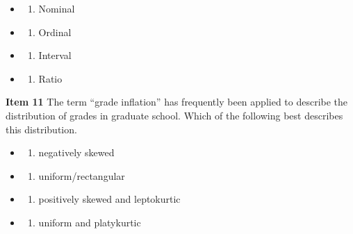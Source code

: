 \documentclass[
  english,
]{book}
\providecommand{\tightlist}{%
  \setlength{\itemsep}{0pt}\setlength{\parskip}{0pt}}
\begin{document}
\begin{itemize}
\item
  \begin{enumerate}
  \def\labelenumi{\alph{enumi})}
  \tightlist
  \item
    Nominal
  \end{enumerate}
\item
  \begin{enumerate}
  \def\labelenumi{\alph{enumi})}
  \setcounter{enumi}{1}
  \tightlist
  \item
    Ordinal
  \end{enumerate}
\item
  \begin{enumerate}
  \def\labelenumi{\alph{enumi})}
  \setcounter{enumi}{2}
  \tightlist
  \item
    Interval
  \end{enumerate}
\item
  \begin{enumerate}
  \def\labelenumi{\alph{enumi})}
  \setcounter{enumi}{3}
  \tightlist
  \item
    Ratio
  \end{enumerate}
\end{itemize}

\textbf{Item 11} The term ``grade inflation'' has frequently been applied to describe the distribution of grades in graduate school. Which of the following best describes this distribution.

\begin{itemize}
\item
  \begin{enumerate}
  \def\labelenumi{\alph{enumi})}
  \tightlist
  \item
    negatively skewed
  \end{enumerate}
\item
  \begin{enumerate}
  \def\labelenumi{\alph{enumi})}
  \setcounter{enumi}{1}
  \tightlist
  \item
    uniform/rectangular
  \end{enumerate}
\item
  \begin{enumerate}
  \def\labelenumi{\alph{enumi})}
  \setcounter{enumi}{2}
  \tightlist
  \item
    positively skewed and leptokurtic
  \end{enumerate}
\item
  \begin{enumerate}
  \def\labelenumi{\alph{enumi})}
  \setcounter{enumi}{3}
  \tightlist
  \item
    uniform and platykurtic
  \end{enumerate}
\end{itemize}
\end{document}

